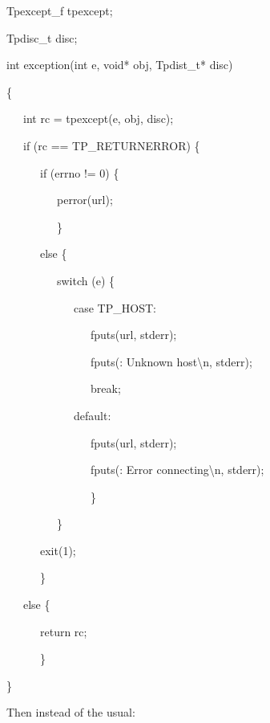 {\ttfamily\mdseries
Tpexcept\_f tpexcept;}

{\ttfamily\mdseries
Tpdisc\_t disc;}


\bigskip

{\ttfamily\mdseries
int exception(int e, void* obj, Tpdist\_t* disc)}

{\ttfamily\mdseries
\{}

{\ttfamily\mdseries
\ \ \ int rc = tpexcept(e, obj, disc);}

{\ttfamily\mdseries
\ \ \ if (rc == TP\_RETURNERROR) \{}

{\ttfamily\mdseries
\ \ \ \ \ \ if (errno != 0) \{}

{\ttfamily\mdseries
\ \ \ \ \ \ \ \ \ perror(url);}

{\ttfamily\mdseries
\ \ \ \ \ \ \ \ \ \}}

{\ttfamily\mdseries
\ \ \ \ \ \ else \{}

{\ttfamily\mdseries
\ \ \ \ \ \ \ \ \ switch (e) \{}

{\ttfamily\mdseries
\ \ \ \ \ \ \ \ \ \ \ \ case TP\_HOST:}

{\ttfamily\mdseries
\ \ \ \ \ \ \ \ \ \ \ \ \ \ \ fputs(url, stderr);}

{\ttfamily\mdseries
\ \ \ \ \ \ \ \ \ \ \ \ \ \ \ fputs({\textquotedbl}: Unknown host{\textbackslash}n{\textquotedbl}, stderr);}

{\ttfamily\mdseries
\ \ \ \ \ \ \ \ \ \ \ \ \ \ \ break;}

{\ttfamily\mdseries
\ \ \ \ \ \ \ \ \ \ \ \ default:}

{\ttfamily\mdseries
\ \ \ \ \ \ \ \ \ \ \ \ \ \ \ fputs(url, stderr);}

{\ttfamily\mdseries
\ \ \ \ \ \ \ \ \ \ \ \ \ \ \ fputs({\textquotedbl}: Error connecting{\textbackslash}n{\textquotedbl}, stderr);}

{\ttfamily\mdseries
\ \ \ \ \ \ \ \ \ \ \ \ \ \ \ \}}

{\ttfamily\mdseries
\ \ \ \ \ \ \ \ \ \}}

{\ttfamily\mdseries
\ \ \ \ \ \ exit(1); }

{\ttfamily\mdseries
\ \ \ \ \ \ \}}

{\ttfamily\mdseries
\ \ \ else \{}

{\ttfamily\mdseries
\ \ \ \ \ \ return rc;}

{\ttfamily\mdseries
\ \ \ \ \ \ \}}

{\ttfamily\mdseries
\}}


\bigskip


Then instead of the usual:

